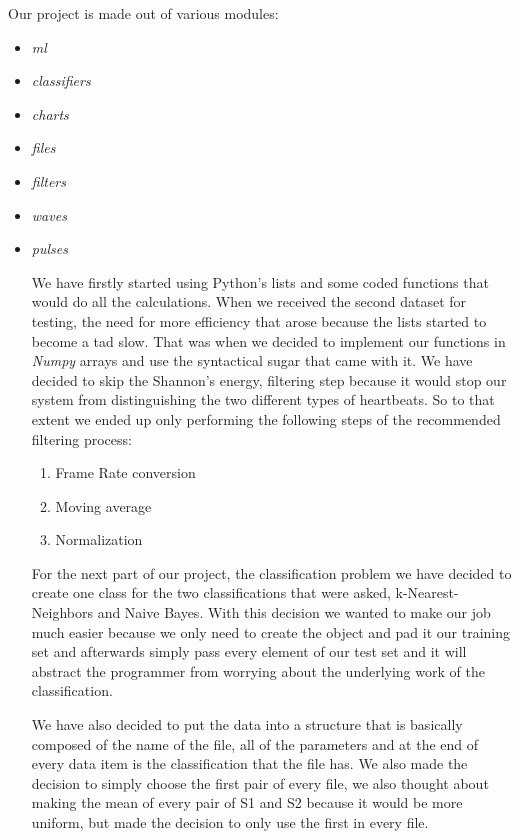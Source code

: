 \documentclass[conference]{IEEEtran}
\begin{document}
Our project is made out of various modules:
\begin{itemize}
	\item \textit{ml}
	\item \textit{classifiers}
	\item \textit{charts}
	\item \textit{files}
	\item \textit{filters}
	\item \textit{waves}
	\item \textit{pulses}
\begin{itemize}

We have firstly started using Python's lists and some coded functions that would
do all the calculations. When we received the second dataset for testing, the
need for more efficiency that arose because the lists started to become a tad
slow. That was when we decided to implement our functions in \textit{Numpy}
arrays and use the syntactical sugar that came with it. We have decided to
skip the Shannon's energy, filtering step because it would stop our system from
distinguishing the two different types of heartbeats. So to that extent we
ended up only performing the following steps of the recommended filtering
process:
\begin{enumerate}
	\item Frame Rate conversion
	\item Moving average
	\item Normalization
\end{enumerate}

For the next part of our project, the classification problem we have decided to
create one class for the two classifications that were asked, k-Nearest-Neighbors
and Naive Bayes. With this decision we wanted to make our job much easier
because we only need to create the object and pad it our training set and
afterwards simply pass every element of our test set and it will abstract the
programmer from worrying about the underlying work of the classification.

We have also decided to put the data into a structure that is basically composed
of the name of the file, all of the parameters and at the end of every data
item is the classification that the file has. We also made the decision to
simply choose the first pair of every file, we also thought about making the
mean of every pair of S1 and S2 because it would be more uniform, but made the
decision to only use the first in every file.


\end{itemize}
\end{itemize}
\end{document}
